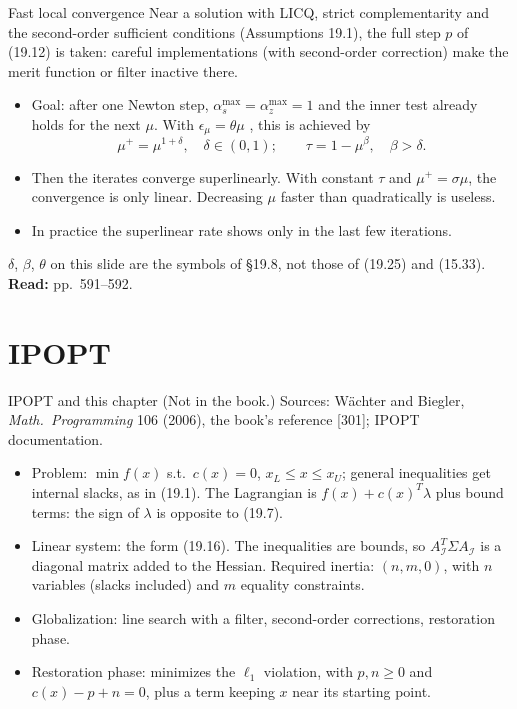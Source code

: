 \documentclass[aspectratio=169,12pt]{beamer}
\newcommand{\eqn}[1]{\text{\small(#1)}}
\newcommand{\readbook}[1]{{\color{red}\textbf{Read:} #1}}
\newcommand{\cI}{\mathcal{I}}
\newcommand{\Ai}{A_{\cI}}
\begin{document}
\begin{frame}{Fast local convergence}
  Near a solution with LICQ, strict complementarity and the second-order sufficient conditions
  (Assumptions 19.1), the full step $p$ of (19.12) is taken: careful implementations (with second-order
  correction) make the merit function or filter inactive there.
  \begin{itemize}\setlength\itemsep{0.3em}
    \item Goal: after one Newton step, $\alpha_{s}^{\max}=\alpha_{z}^{\max}=1$ and the inner test already holds for
      the next $\mu$. With $\epsilon_{\mu}=\theta\mu$ \eqn{19.57}, this is achieved by
      \[ \mu^{+}=\mu^{1+\delta},\quad\delta\in(0,1);\qquad\tau=1-\mu^{\beta},\quad\beta>\delta . \tag{19.58} \]
    \item Then the iterates converge superlinearly. With constant $\tau$ and $\mu^{+}=\sigma\mu$, the convergence is
      only linear. Decreasing $\mu$ faster than quadratically is useless.
    \item In practice the superlinear rate shows only in the last few iterations.
  \end{itemize}
  $\delta$, $\beta$, $\theta$ on this slide are the symbols of \S19.8, not those of (19.25) and (15.33).
  \readbook{pp.~591--592.}
\end{frame}

\section{IPOPT}

\begin{frame}{IPOPT and this chapter {\normalfont\small(Not in the book.)}}
  Sources: Wächter and Biegler, \emph{Math.\ Programming} 106 (2006), the book's reference [301]; IPOPT documentation.
  \begin{itemize}\setlength\itemsep{0.3em}
    \item Problem: $\min f(x)$ s.t.\ $c(x)=0$, $x_{L}\le x\le x_{U}$; general inequalities get internal
      slacks, as in (19.1). The Lagrangian is $f(x)+c(x)^{T}\lambda$ plus bound terms: the sign of $\lambda$ is
      opposite to (19.7).
    \item Linear system: the form (19.16). The inequalities are bounds, so $\Ai^{T}\Sigma\Ai$ is a diagonal
      matrix added to the Hessian. Required inertia: $(n,m,0)$, with $n$ variables (slacks included) and
      $m$ equality constraints.
    \item Globalization: line search with a filter, second-order corrections, restoration phase.
    \item Restoration phase: minimizes the $\ell_{1}$ violation, with $p,n\ge 0$ and $c(x)-p+n=0$,
      plus a term keeping $x$ near its starting point.
  \end{itemize}
\end{frame}
\end{document}
